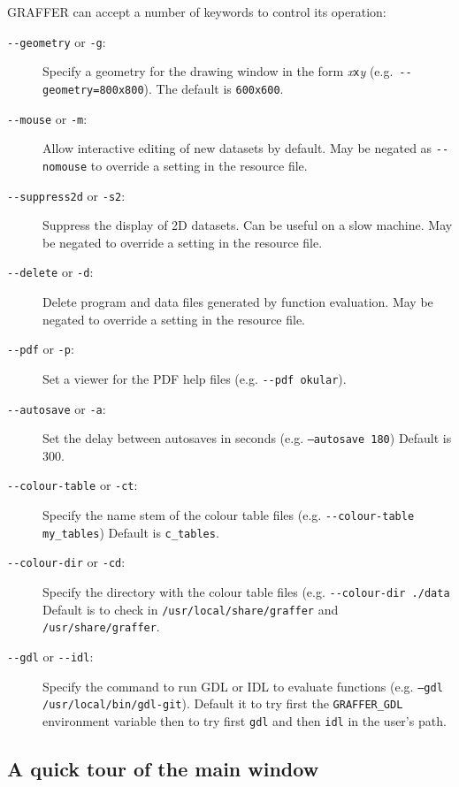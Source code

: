 \documentclass[11pt,twoside,english]{article}
\begin{document}
GRAFFER can accept a number of keywords to control its operation:

\begin{description}

\item [\texttt{-{}-geometry} or \texttt{-g}:] Specify a geometry for the
  drawing window in the form \textit{x}\texttt{x}\textit{y} (e.g.\
  \texttt{-{}-geometry=800x800}). The default is \texttt{600x600}.
\item[\texttt{-{}-mouse} or \texttt{-m}:] Allow interactive editing of
  new datasets  by default. May be negated as \texttt{-{}-nomouse} to
  override a setting in the resource file.
\item[\texttt{-{}-suppress\-2d} or \texttt{-s2}:] Suppress the display
  of 2D datasets. Can be useful on a slow machine. May be negated to
  override a setting in the resource file.
\item[\texttt{-{}-delete} or \texttt{-d}:] Delete program and data
  files generated by function evaluation. May be negated to override
  a setting in  the resource file.
\item[\texttt{-{}-pdf} or \texttt{-p}:] Set a viewer for the PDF help
  files (e.g. \texttt{-{}-pdf okular}).
\item[\texttt{-{}-autosave} or \texttt{-a}:] Set the delay between
  autosaves in seconds (e.g. \texttt{--autosave 180}) Default is 300.
\item[\texttt{-{}-colour-table} or \texttt{-ct}:] Specify the name stem
  of the colour table files (e.g. \texttt{-{}-colour-table my\_tables})
  Default is \texttt{c\_tables}.
\item[\texttt{-{}-colour-dir} or \texttt{-cd}:] Specify the directory
  with the colour table files (e.g. \texttt{-{}-colour-dir ./data}
  Default is to check in \texttt{/usr/local/share/graffer} and
  \texttt{/usr/share/graffer}. 
\item[\texttt{-{}-gdl} or \texttt{-{}-idl}:]
  Specify the command to run GDL or IDL to evaluate functions
  (e.g. \texttt{--gdl /usr/local/bin/gdl-git}). Default it to try first
  the \texttt{GRAFFER\_GDL} environment variable then to try first
  \texttt{gdl} and then \texttt{idl} in the user's path.
\end{description}

\subsection{A quick tour of the main window}
\end{document}
